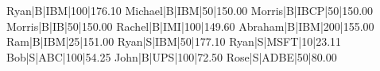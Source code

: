 Ryan|B|IBM|100|176.10
Michael|B|IBM|50|150.00
Morris|B|IBCP|50|150.00
Morris|B|IB|50|150.00
Rachel|B|IMI|100|149.60 
Abraham|B|IBM|200|155.00
Ram|B|IBM|25|151.00
Ryan|S|IBM|50|177.10
Ryan|S|MSFT|10|23.11
Bob|S|ABC|100|54.25
John|B|UPS|100|72.50
Rose|S|ADBE|50|80.00
